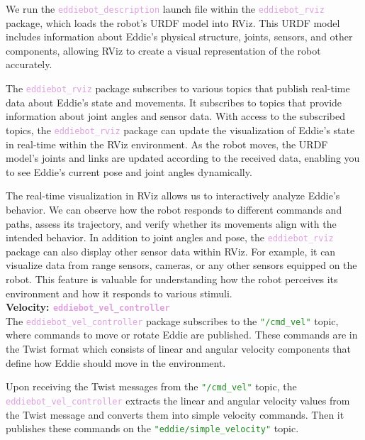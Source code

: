 We run the \textcolor{Plum}{\texttt{eddiebot\_description}} launch file within the \textcolor{Plum}{\texttt{eddiebot\_rviz}} package, which loads the robot's URDF model into RViz. This URDF model includes information about Eddie's physical structure, joints, sensors, and other components, allowing RViz to create a visual representation of the robot accurately. 

The \textcolor{Plum}{\texttt{eddiebot\_rviz}} package subscribes to various topics that publish real-time data about Eddie's state and movements. It subscribes to topics that provide information about joint angles and sensor data.
With access to the subscribed topics, the \textcolor{Plum}{\texttt{eddiebot\_rviz}} package can update the visualization of Eddie's state in real-time within the RViz environment. As the robot moves, the URDF model's joints and links are updated according to the received data, enabling you to see Eddie's current pose and joint angles dynamically. 

The real-time visualization in RViz allows us to interactively analyze Eddie's behavior. We can observe how the robot responds to different commands and paths, assess its trajectory, and verify whether its movements align with the intended behavior.
In addition to joint angles and pose, the \textcolor{Plum}{\texttt{eddiebot\_rviz}} package can also display other sensor data within RViz. For example, it can visualize data from range sensors, cameras, or any other sensors equipped on the robot. This feature is valuable for understanding how the robot perceives its environment and how it responds to various stimuli.\\

\textbf{Velocity: \textcolor{Plum}{\texttt{\Large eddiebot\_vel\_controller}}}\\
The \textcolor{Plum}{\texttt{eddiebot\_vel\_controller}} package subscribes to the \textcolor{ForestGreen}{\texttt{"/cmd\_vel"}} topic, where commands to move or rotate Eddie are published. These commands are in the Twist format which consists of linear and angular velocity components that define how Eddie should move in the environment.

Upon receiving the Twist messages from the \textcolor{ForestGreen}{\texttt{"/cmd\_vel"}} topic, the \textcolor{Plum}{\texttt{eddiebot\_vel\_controller}} extracts the linear and angular velocity values from the Twist message and converts them into simple velocity commands. Then it publishes these commands on the \textcolor{ForestGreen}{\texttt{"eddie/simple\_velocity"}} topic. \\

